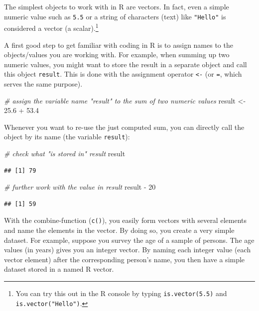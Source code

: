 \documentclass[
  12pt,
]{style/krantz}
\newenvironment{Shaded}{\begin{snugshade}}{\end{snugshade}}
\newcommand{\CommentTok}[1]{\textcolor[rgb]{0.56,0.35,0.01}{\textit{#1}}}
\newcommand{\DecValTok}[1]{\textcolor[rgb]{0.00,0.00,0.81}{#1}}
\newcommand{\FloatTok}[1]{\textcolor[rgb]{0.00,0.00,0.81}{#1}}
\newcommand{\NormalTok}[1]{#1}
\newcommand{\OtherTok}[1]{\textcolor[rgb]{0.56,0.35,0.01}{#1}}
\newcommand{\SpecialCharTok}[1]{\textcolor[rgb]{0.00,0.00,0.00}{#1}}
\begin{document}
The simplest objects to work with in R are vectors. In fact, even a simple numeric value such as \texttt{5.5} or a string of characters (text) like \texttt{"Hello"} is considered a vector (a scalar).\footnote{You can try this out in the R console by typing \texttt{is.vector(5.5)} and \texttt{is.vector("Hello")}.}

A first good step to get familiar with coding in R is to assign names to the objects/values you are working with. For example, when summing up two numeric values, you might want to store the result in a separate object and call this object \texttt{result}. This is done with the assignment operator \texttt{\textless{}-} (or \texttt{=}, which serves the same purpose).

\begin{Shaded}
\begin{Highlighting}[]
\CommentTok{\# assign the variable name "result" to the sum of two numeric values}
\NormalTok{result }\OtherTok{\textless{}{-}} \FloatTok{25.6} \SpecialCharTok{+} \FloatTok{53.4} 
\end{Highlighting}
\end{Shaded}

Whenever you want to re-use the just computed sum, you can directly call the object by its name (the variable \texttt{result}):

\begin{Shaded}
\begin{Highlighting}[]
\CommentTok{\# check what "is stored in" result}
\NormalTok{result}
\end{Highlighting}
\end{Shaded}

\begin{verbatim}
## [1] 79
\end{verbatim}

\begin{Shaded}
\begin{Highlighting}[]
\CommentTok{\# further work with the value in result}
\NormalTok{result }\SpecialCharTok{{-}} \DecValTok{20}
\end{Highlighting}
\end{Shaded}

\begin{verbatim}
## [1] 59
\end{verbatim}

With the combine-function (\texttt{c()}), you easily form vectors with several elements and name the elements in the vector. By doing so, you create a very simple dataset. For example, suppose you survey the age of a sample of persons. The age values (in years) gives you an integer vector. By naming each integer value (each vector element) after the corresponding person's name, you then have a simple dataset stored in a named R vector.
\end{document}
